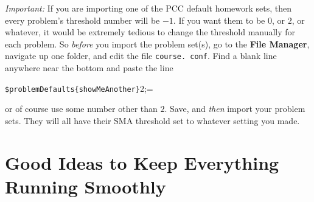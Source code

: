 \documentclass[12pt]{article}
\newcommand{\menu}[1]{\textbf{#1}}
\newcommand{\FM}{\menu{File Manager}}
\begin{document}
\emph{Important:}
If you are importing one of the PCC default homework sets, then every problem's threshold number will be $-1$.
If you want them to be $0$, or $2$, or whatever, it would be extremely tedious to change the threshold manually for each problem.
So \emph{before} you import the problem set(s), go to the \FM, navigate up one folder, and edit the file \texttt{course.
	conf}.
Find a blank line anywhere near the bottom and paste the line \begin{center} \verb=$problemDefaults{showMeAnother}=2;= \end{center} or of course use some number other than $2$.
Save, and \emph{then} import your problem sets.
They will all have their SMA threshold set to whatever setting you made.

\section{Good Ideas to Keep Everything Running Smoothly}\label{goodideas}
\end{document}
